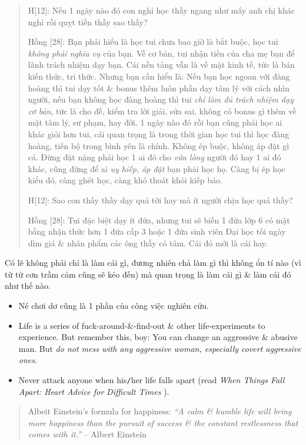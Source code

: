 \documentclass[12pt,twoside]{book}
\begin{document}
\begin{quote}
	H[12]: Nếu 1 ngày nào đó con nghỉ học thầy ngang như mấy anh chị khác nghỉ rồi quỵt tiền thầy sao thầy?
	
	{\sf Hồng [28]}: Bạn phải hiểu là học tui chưa bao giờ là bắt buộc, học tui {\it không phải nghĩa vụ} của bạn. Về cơ bản, tui nhận tiền của cha mẹ bạn để lãnh trách nhiệm dạy bạn. Cái nền tảng vẫn là về mặt kinh tế, tức là bán kiến thức, tri thức. Nhưng bạn cần hiểu là: Nếu bạn học ngoan với đàng hoàng thì tui dạy tốt \& bonus thêm luôn phần dạy tâm lý với cách nhìn người, nếu bạn không học đàng hoàng thì tui {\it chỉ làm đủ trách nhiệm dạy cơ bản}, tức là cho đề, kiểm tra lời giải, sửa sai, không có bonus gì thêm về mặt tâm lý, sư phạm, hay đời. 1 ngày nào đó rồi bạn cũng phải học ai khác giỏi hơn tui, cái quan trọng là trong thời gian học tui thì học đàng hoàng, tiến bộ trong bình yên là chính. Không ép buộc, không áp đặt gì cả. Đừng đặt nặng phải học 1 ai đó cho {\it vừa lòng} người đó hay 1 ai đó khác, cũng đừng để ai {\it uy hiếp, áp đặt} bạn phải học họ. Càng bị ép học kiểu đó, càng ghét học, càng khó thoát khỏi kiếp báo.
	
	H[12]: Sao con thấy thầy dạy quá tời hay mà ít người chịu học quá thầy?
	
	{\sf Hồng [28]}: Tui đặc biệt dạy ít đứa, nhưng tui sẽ biến 1 đứa lớp 6 có mặt bằng nhận thức hơn 1 đứa cấp 3 hoặc 1 đứa sinh viên Đại học tối ngày dìm giá \& nhân phẩm các ông thầy có tâm. Cái đó mới là cái hay.
\end{quote}

Có lẽ không phải chỉ là làm cái gì, đương nhiên chả làm gì thì không ổn tí nào (vì từ từ cơn trầm cảm cũng sẽ kéo đến) mà quan trọng là làm cái gì \& làm cái đó như thế nào.

\begin{itemize}
	\item Né chơi dơ cũng là 1 phần của công việc nghiên cứu.
	\item Life is a series of fuck-around-\&-find-out \& other life-experiments to experience. But remember this, boy: You can change an aggressive \& abusive man. But {\it do not mess with any aggressive woman, especially covert aggressive ones}. 
	\item Never attack anyone when his{\tt/}her life falls apart (read {\it When Things Fall Apart: Heart Advice for Difficult Times} \cite{Chodron_fall_apart,Chodron_fall_apart_VN}).
\end{itemize}

\begin{quote}
	{\sc Albeit Einstein}'s formula for happiness: {\it``A calm \& humble life will bring more happiness than the pursuit of success \& the constant restlessness that comes with it.''} -- {\sc Albert Einstein}
\end{quote}
\end{document}
